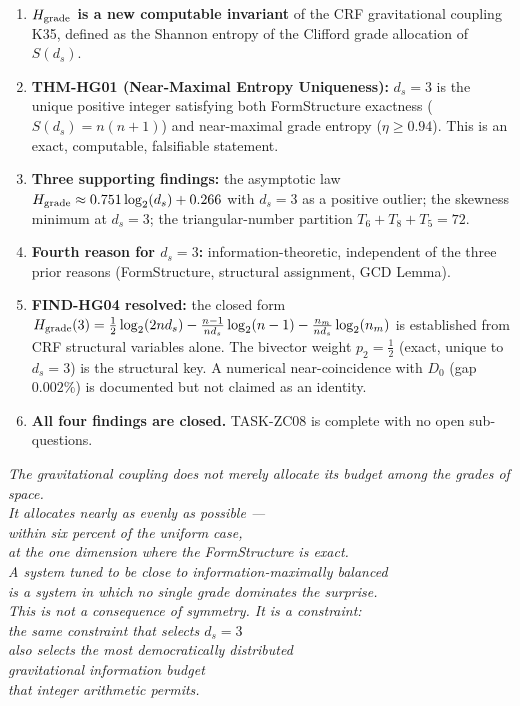 \documentclass[12pt, a4paper]{article}
\begin{document}
\begin{enumerate}[leftmargin=*]

\item \textbf{$H_{\rm grade}$ is a new computable invariant} of
  the CRF gravitational coupling K35, defined as the Shannon
  entropy of the Clifford grade allocation of $S(d_s)$.

\item \textbf{THM-HG01 (Near-Maximal Entropy Uniqueness):}
  $d_s = 3$ is the unique positive integer satisfying both
  FormStructure exactness ($S(d_s) = n(n+1)$) and near-maximal
  grade entropy ($\eta \geq 0.94$). This is an exact, computable,
  falsifiable statement.

\item \textbf{Three supporting findings:}
  the asymptotic law $H_{\rm grade} \approx 0.751\log_2(d_s)
  + 0.266$ with $d_s=3$ as a positive outlier;
  the skewness minimum at $d_s=3$;
  the triangular-number partition
  $T_6 + T_8 + T_5 = 72$.

\item \textbf{Fourth reason for $d_s = 3$:}
  information-theoretic, independent of the three prior reasons
  (FormStructure, structural assignment, GCD Lemma).

\item \textbf{FIND-HG04 resolved:}
  the closed form $H_{\rm grade}(3) = \tfrac{1}{2}\log_2(2nd_s)
  - \tfrac{n-1}{nd_s}\log_2(n-1) - \tfrac{n_m}{nd_s}\log_2(n_m)$
  is established from CRF structural variables alone. The bivector
  weight $p_2 = \tfrac{1}{2}$ (exact, unique to $d_s=3$) is the
  structural key. A numerical near-coincidence with $D_0$
  (gap $0.002\%$) is documented but not claimed as an identity.

\item \textbf{All four findings are closed.}
  TASK-ZC08 is complete with no open sub-questions.

\end{enumerate}

\bigskip
\begin{center}
\textit{The gravitational coupling does not merely allocate its
budget among the grades of space.\\
It allocates nearly as evenly as possible ---\\
within six percent of the uniform case,\\
at the one dimension where the FormStructure is exact.\\[0.5em]
A system tuned to be close to information-maximally balanced\\
is a system in which no single grade dominates the surprise.\\
This is not a consequence of symmetry. It is a constraint:\\
the same constraint that selects $d_s = 3$\\
also selects the most democratically distributed\\
gravitational information budget\\
that integer arithmetic permits.}
\end{center}
\end{document}
